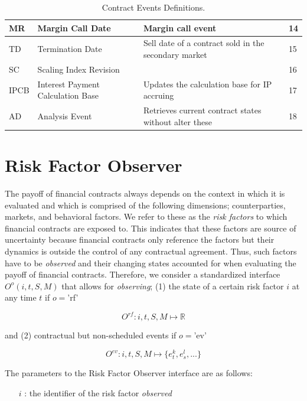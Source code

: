\documentclass[9pt,oneside]{amsart}
\newcommand{\Real}{\mathbb{R}}
\newcommand{\obsfull}[5]{O^{#1}(#2,#3,#4,#5)}
\newcommand{\obsfunc}[1]{O^{#1}}
\begin{document}
\begin{multicols}{2}
\begin{table}[H]
\begin{tabular}{| p{0.23in}p{0.7in}p{1.4in}p{0.2in} |}
	\hline
	MR & Margin Call Date & Margin call event & 14 \\
	\hline
	TD & Termination Date & Sell date of a contract sold in the secondary market & 15 \\
	\hline
	SC & Scaling Index Revision & & 16 \\
	\hline
	IPCB & Interest Payment Calculation Base & Updates the calculation base for IP accruing & 17 \\
	\hline
	AD & Analysis Event & Retrieves current contract states without alter these & 18 \\
	\hline
	\end{tabular}
	\caption{Contract Events Definitions.}
	\label{tbl:events}
\end{table}





\section{Risk Factor Observer}\label{rfobs}

The payoff of financial contracts always depends on the context in which it is evaluated and which is comprised of the following dimensions; counterparties, markets, and behavioral factors. We refer to these as the \textit{risk factors} to which financial contracts are exposed to. This indicates that these factors are source of uncertainty because financial contracts only reference the factors but their dynamics is outside the control of any contractual agreement. Thus, such factors have to be \textit{observed} and their changing states accounted for when evaluating the payoff of financial contracts. Therefore, we consider a standardized interface $\obsfull{o}{i}{t}{S}{M}$ that allows for \textit{observing}; (1) the state of a certain risk factor $i$ at any time $t$ if $o=$'rf'

\[
	\obsfunc{rf}: i,t,S,M \mapsto \Real
\]

and (2) contractual but non-scheduled events if $o=$'ev'

\[
	\obsfunc{ev}: i,t,S,M \mapsto \{e_t^{k},e_s^{l},...\}
\]

The parameters to the Risk Factor Observer interface are as follows:

\begin{itemize}
	\item[$i$]: the identifier of the risk factor \textit{observed}


\end{itemize}
\end{multicols}
\end{document}
